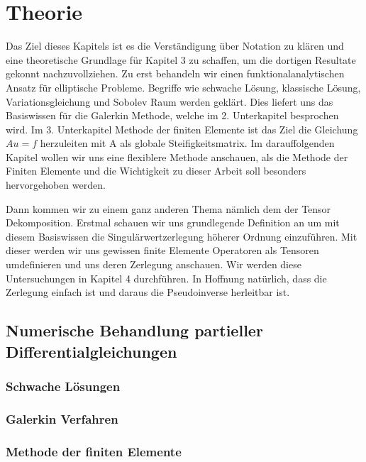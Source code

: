 \documentclass[12pt,a4paper]{scrartcl}
\numberwithin{equation}{section}
\begin{document}
\section{Theorie}
Das Ziel dieses Kapitels ist es die Verständigung über Notation zu klären und eine theoretische Grundlage für Kapitel 3 zu schaffen, um die dortigen Resultate gekonnt nachzuvollziehen. 
Zu erst behandeln wir einen funktionalanalytischen Ansatz für elliptische Probleme. Begriffe wie schwache Lösung, klassische Lösung, Variationsgleichung und Sobolev Raum werden geklärt. Dies liefert uns das Basiswissen für die Galerkin Methode, welche im 2. Unterkapitel besprochen wird. 
Im 3. Unterkapitel Methode der finiten Elemente ist das Ziel die Gleichung $Au=f$ herzuleiten mit A als globale Steifigkeitsmatrix.
Im darauffolgenden Kapitel wollen wir uns eine flexiblere Methode anschauen, als die Methode der Finiten Elemente und die Wichtigkeit zu dieser Arbeit soll besonders hervorgehoben werden.

Dann kommen wir zu einem ganz anderen Thema nämlich dem der Tensor Dekomposition. 
Erstmal schauen wir uns grundlegende Definition an um mit diesem Basiswissen die Singulärwertzerlegung höherer Ordnung einzuführen. Mit dieser werden wir uns gewissen finite Elemente Operatoren als Tensoren umdefinieren und uns deren Zerlegung anschauen. Wir werden diese Untersuchungen in Kapitel 4 durchführen. In Hoffnung natürlich, dass die Zerlegung einfach ist und daraus die Pseudoinverse herleitbar ist.


\newpage
\subsection{Numerische Behandlung partieller Differentialgleichungen}
\subsubsection{Schwache Lösungen}


\newpage
\subsubsection{Galerkin Verfahren}


\newpage
\subsubsection{Methode der finiten Elemente}

\end{document}
